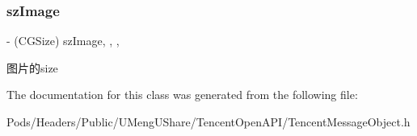 \subsubsection{\texorpdfstring{sz\+Image}{szImage}}
{\footnotesize\ttfamily -\/ (C\+G\+Size) sz\+Image\hspace{0.3cm}{\ttfamily [read]}, {\ttfamily [write]}, {\ttfamily [nonatomic]}, {\ttfamily [assign]}}

图片的size 

The documentation for this class was generated from the following file\+:\begin{DoxyCompactItemize}
\item 
Pods/\+Headers/\+Public/\+U\+Meng\+U\+Share/\+Tencent\+Open\+A\+P\+I/Tencent\+Message\+Object.\+h\end{DoxyCompactItemize}
